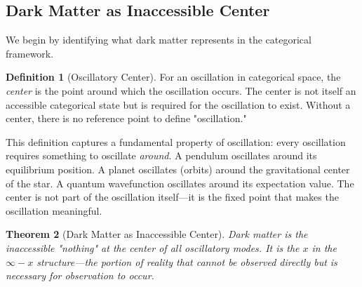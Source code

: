 \documentclass[12pt,a4paper]{article}
\newtheorem{theorem}{Theorem}[section]
\theoremstyle{definition}
\newtheorem{definition}[theorem]{Definition}
\theoremstyle{remark}
\begin{document}
\subsection{Dark Matter as Inaccessible Center}

We begin by identifying what dark matter represents in the categorical framework.

\begin{definition}[Oscillatory Center]
\label{def:oscillatory_centre}
For an oscillation in categorical space, the \emph{center} is the point around which the oscillation occurs. The center is not itself an accessible categorical state but is required for the oscillation to exist. Without a center, there is no reference point to define "oscillation."
\end{definition}

This definition captures a fundamental property of oscillation: every oscillation requires something to oscillate \emph{around}. A pendulum oscillates around its equilibrium position. A planet oscillates (orbits) around the gravitational center of the star. A quantum wavefunction oscillates around its expectation value. The center is not part of the oscillation itself—it is the fixed point that makes the oscillation meaningful.

\begin{theorem}[Dark Matter as Inaccessible Center]
\label{thm:dark_matter}
Dark matter is the inaccessible "nothing" at the center of all oscillatory modes. It is the $x$ in the $\infty - x$ structure—the portion of reality that cannot be observed directly but is necessary for observation to occur.
\end{theorem}
\end{document}
